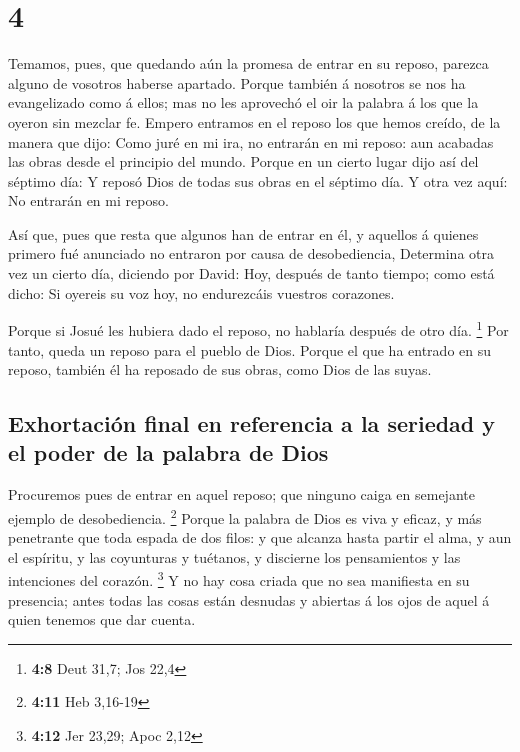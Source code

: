 \hypertarget{section-3}{%
\section{4}\label{section-3}}

 Temamos, pues, que quedando aún la promesa de entrar en
su reposo, parezca alguno de vosotros haberse apartado. 
Porque también á nosotros se nos ha evangelizado como á ellos; mas no
les aprovechó el oir la palabra á los que la oyeron sin mezclar fe.
 Empero entramos en el reposo los que hemos creído, de la
manera que dijo: Como juré en mi ira, no entrarán en mi reposo: aun
acabadas las obras desde el principio del mundo.  Porque
en un cierto lugar dijo así del séptimo día: Y reposó Dios de todas sus
obras en el séptimo día.  Y otra vez aquí: No entrarán en
mi reposo.

 Así que, pues que resta que algunos han de entrar en él,
y aquellos á quienes primero fué anunciado no entraron por causa de
desobediencia,  Determina otra vez un cierto día, diciendo
por David: Hoy, después de tanto tiempo; como está dicho: Si oyereis su
voz hoy, no endurezcáis vuestros corazones.

 Porque si Josué les hubiera dado el reposo, no hablaría
después de otro día. \footnote{\textbf{4:8} Deut 31,7; Jos 22,4}
 Por tanto, queda un reposo para el pueblo de Dios.
 Porque el que ha entrado en su reposo, también él ha
reposado de sus obras, como Dios de las suyas.

\hypertarget{exhortaciuxf3n-final-en-referencia-a-la-seriedad-y-el-poder-de-la-palabra-de-dios}{%
\subsection{Exhortación final en referencia a la seriedad y el poder de
la palabra de
Dios}\label{exhortaciuxf3n-final-en-referencia-a-la-seriedad-y-el-poder-de-la-palabra-de-dios}}

 Procuremos pues de entrar en aquel reposo; que ninguno
caiga en semejante ejemplo de desobediencia. \footnote{\textbf{4:11} Heb
  3,16-19}  Porque la palabra de Dios es viva y eficaz, y
más penetrante que toda espada de dos filos: y que alcanza hasta partir
el alma, y aun el espíritu, y las coyunturas y tuétanos, y discierne los
pensamientos y las intenciones del corazón. \footnote{\textbf{4:12} Jer
  23,29; Apoc 2,12}  Y no hay cosa criada que no sea
manifiesta en su presencia; antes todas las cosas están desnudas y
abiertas á los ojos de aquel á quien tenemos que dar cuenta.

